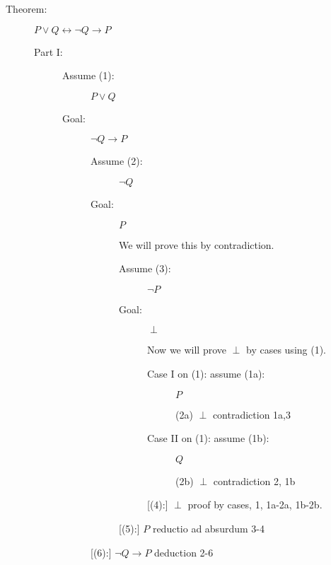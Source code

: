 \documentclass[12pt]{article}
\begin{document}
\begin{description}

\item[Theorem:]  $P \vee Q \leftrightarrow \neg Q \rightarrow P$

\begin{description}

\item[Part I:]

\begin{description}

\item[Assume (1):]  $P \vee Q$

\item[Goal:]  $\neg Q \rightarrow P$

\begin{description}

\item[Assume (2):]  $\neg Q$

\item[Goal:]  $P$

We will prove this by contradiction.

\begin{description}

\item[Assume (3):]  $\neg P$

\item[Goal:]  $\perp$

Now we will prove $\perp$ by cases using (1).

\begin{description}

\item [Case I on (1):  assume (1a):]  $P$

(2a)  $\perp$  contradiction 1a,3

\item[Case II on (1):  assume (1b):]  $Q$

(2b) $\perp$  contradiction 2, 1b

\end{description}

[(4):]  $\perp$  proof by cases, 1, 1a-2a, 1b-2b.

\end{description}

[(5):]  $P$  reductio ad absurdum 3-4

\end{description}

[(6):]  $\neg Q \rightarrow P$  deduction 2-6


\end{description}
\end{description}
\end{description}
\end{document}
